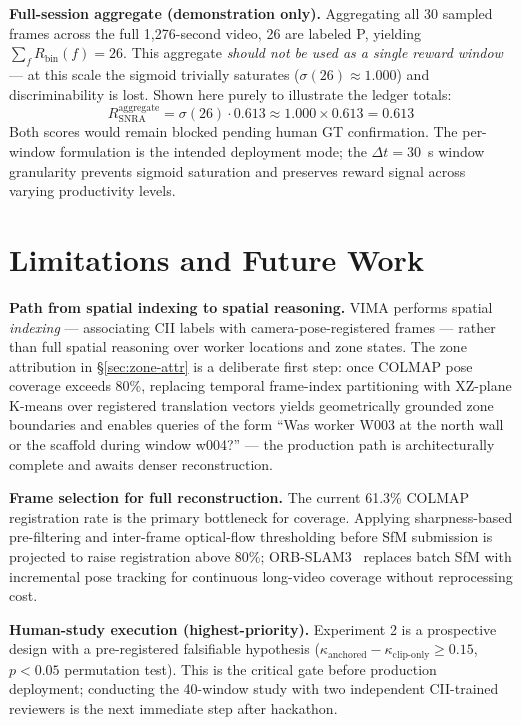 \documentclass[sigconf,nonacm]{acmart}
\begin{document}
\textbf{Full-session aggregate (demonstration only).}
Aggregating all 30 sampled frames across the full 1,276-second video, 26 are
labeled P, yielding $\sum_{f} R_{\text{bin}}(f) = 26$.  This aggregate
\emph{should not be used as a single reward window} --- at this scale the
sigmoid trivially saturates ($\sigma(26) \approx 1.000$) and discriminability
is lost.  Shown here purely to illustrate the ledger totals:
\begin{equation}
  R_{\text{SNRA}}^{\text{aggregate}} = \sigma(26) \cdot 0.613
    \approx 1.000 \times 0.613 = 0.613
\end{equation}
Both scores would remain blocked pending human GT confirmation. The per-window
formulation is the intended deployment mode; the $\Delta t = 30$~s window
granularity prevents sigmoid saturation and preserves reward signal across
varying productivity levels.

\section{Limitations and Future Work}
\label{sec:limitations}

\textbf{Path from spatial indexing to spatial reasoning.} VIMA performs spatial
\emph{indexing} --- associating CII labels with camera-pose-registered frames
--- rather than full spatial reasoning over worker locations and zone states.
The zone attribution in \S\ref{sec:zone-attr} is a deliberate first step:
once COLMAP pose coverage exceeds 80\%, replacing temporal frame-index
partitioning with XZ-plane K-means over registered translation vectors yields
geometrically grounded zone boundaries and enables queries of the form
``Was worker W003 at the north wall or the scaffold during window w004?'' ---
the production path is architecturally complete and awaits denser reconstruction.

\textbf{Frame selection for full reconstruction.} The current 61.3\%
COLMAP registration rate is the primary bottleneck for coverage.
Applying sharpness-based pre-filtering and inter-frame optical-flow thresholding
before SfM submission is projected to raise registration above 80\%;
ORB-SLAM3~\cite{orbslam3_2021} replaces batch SfM with incremental pose tracking
for continuous long-video coverage without reprocessing cost.

\textbf{Human-study execution (highest-priority).} Experiment 2 is a prospective
design with a pre-registered falsifiable hypothesis
($\kappa_{\text{anchored}} - \kappa_{\text{clip-only}} \geq 0.15$, $p < 0.05$
permutation test). This is the critical gate before production deployment;
conducting the 40-window study with two independent CII-trained reviewers is the
next immediate step after hackathon.
\end{document}
